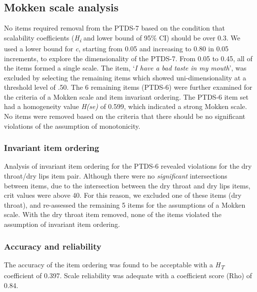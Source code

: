 \documentclass[12pt,twoside,]{pinp}
\begin{document}
\hypertarget{mokken-scale-analysis}{%
\subsection{Mokken scale analysis}\label{mokken-scale-analysis}}

No items required removal from the PTDS-7 based on the condition that
scalability coefficients (\emph{H\textsubscript{i}} and lower bound of
95\% CI) should be over 0.3. We used a lower bound for \emph{c},
starting from 0.05 and increasing to 0.80 in 0.05 increments, to explore
the dimensionality of the PTDS-7. From 0.05 to 0.45, all of the items
formed a single scale. The item, `\emph{I have a bad taste in my
mouth}', was excluded by selecting the remaining items which showed
uni-dimensionality at a threshold level of .50. The 6 remaining items
(PTDS-6) were further examined for the criteria of a Mokken scale and
item invariant ordering. The PTDS-6 item set had a homogeneity value
\emph{H(se)} of 0.599, which indicated a strong Mokken scale. No items
were removed based on the criteria that there should be no significant
violations of the assumption of monotonicity.

\hypertarget{invariant-item-ordering}{%
\subsubsection{Invariant item ordering}\label{invariant-item-ordering}}

Analysis of invariant item ordering for the PTDS-6 revealed violations
for the dry throat/dry lips item pair. Although there were no
\emph{significant} intersections between items, due to the intersection
between the dry throat and dry lips items, crit values were above 40.
For this reason, we excluded one of these items (dry throat), and
re-assessed the remaining 5 items for the assumptions of a Mokken scale.
With the dry throat item removed, none of the items violated the
assumption of invariant item ordering.

\hypertarget{accuracy-and-reliability}{%
\subsubsection{Accuracy and
reliability}\label{accuracy-and-reliability}}

The accuracy of the item ordering was found to be acceptable with a
\emph{H\textsubscript{T}} coefficient of 0.397. Scale reliability was
adequate with a coefficient score (Rho) of 0.84.
\end{document}
